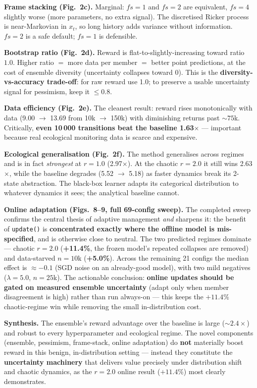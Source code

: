 \documentclass[11pt]{article}
\begin{document}
\textbf{Frame stacking (Fig.~2c).} Marginal: $fs{=}1$ and $fs{=}2$ are
equivalent, $fs{=}4$ slightly worse (more parameters, no extra signal). The
discretised Ricker process is near-Markovian in $x_t$, so long history adds
variance without information. $fs{=}2$ is a safe default; $fs{=}1$ is
defensible.

\textbf{Bootstrap ratio (Fig.~2d).} Reward is flat-to-slightly-increasing
toward ratio $1.0$. Higher ratio $=$ more data per member $=$ better point
predictions, at the cost of ensemble diversity (uncertainty collapses
toward 0). This is the \textbf{diversity-vs-accuracy trade-off}: for raw
reward use 1.0; to preserve a usable uncertainty signal for pessimism, keep
it $\le 0.8$.

\textbf{Data efficiency (Fig.~2e).} The cleanest result: reward rises
monotonically with data (9.00 $\rightarrow$ 13.69 from 10k $\rightarrow$
150k) with diminishing returns past ${\sim}75$k. Critically, \textbf{even
10\,000 transitions beat the baseline 1.63$\times$} --- important because
real ecological monitoring data is scarce and expensive.

\textbf{Ecological generalisation (Fig.~2f).} The method generalises across
regimes and is in fact \emph{strongest} at $r=1.0$ (2.97$\times$). At the
chaotic $r=2.0$ it still wins 2.63$\times$, while the baseline degrades
(5.52 $\rightarrow$ 5.18) as faster dynamics break its 2-state abstraction.
The black-box learner adapts its categorical distribution to whatever
dynamics it sees; the analytical baseline cannot.

\textbf{Online adaptation (Figs.~8--9, full 69-config sweep).} The completed
sweep confirms the central thesis of adaptive management \emph{and} sharpens
it: the benefit of \texttt{update()} is \textbf{concentrated exactly where
the offline model is mis-specified}, and is otherwise close to neutral. The
two predicted regimes dominate --- chaotic $r=2.0$ (\textbf{+11.4\%}, the
frozen model's repeated collapses are removed) and data-starved $n=10$k
(\textbf{+5.0\%}). Across the remaining 21 configs the median effect is
$\approx -0.1$ (SGD noise on an already-good model), with two mild negatives
($\lambda=5.0$, $n=25$k). The actionable conclusion: \textbf{online updates
should be gated on measured ensemble uncertainty} (adapt only when member
disagreement is high) rather than run always-on --- this keeps the $+11.4\%$
chaotic-regime win while removing the small in-distribution cost.

\textbf{Synthesis.} The ensemble's reward advantage over the baseline is
large (${\sim}2.4\times$) and robust to every hyperparameter and ecological
regime. The novel components (ensemble, pessimism, frame-stack, online
adaptation) do \textbf{not} materially boost reward in this benign,
in-distribution setting --- instead they constitute the \textbf{uncertainty
machinery} that delivers value precisely under distribution shift and
chaotic dynamics, as the $r=2.0$ online result ($+11.4\%$) most clearly
demonstrates.
\end{document}
